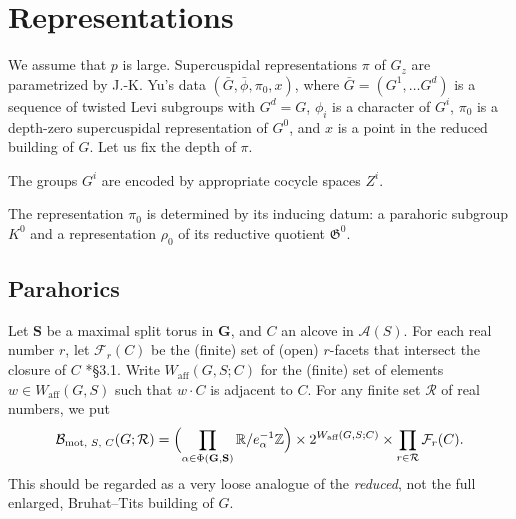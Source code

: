 \documentclass[12pt]{amsart}
\newcommand{\R}{{\mathbb R}}
\newcommand{\Z}{{\mathbb Z}}
\newcommand{\bG}{\mathbf{G}}
\def\R{\mathbb R}
\def\Z{\mathbb Z}
\newcommand{\fG}{\mathfrak G}
\theoremstyle{plain}
\theoremstyle{definition}
\begin{document}
\section{Representations}
We assume that $p$ is large. 
Supercuspidal representations $\pi$ of $G_z$ are parametrized by J.-K. Yu's data 
$(\bar G, \bar\phi, \pi_0, x)$, where $\bar G=(G^1, \dots G^d)$ is a sequence of twisted Levi subgroups with $G^d=G$, $\phi_i$ is a character of $G^i$, $\pi_0$ is a depth-zero supercuspidal representation of $G^0$, and $x$ is a point in the reduced building of $G$.
Let us fix the depth of $\pi$. 

The groups $G^i$ are encoded by appropriate  cocycle spaces $Z^i$.

The representation $\pi_0$ is determined by its inducing datum: a parahoric subgroup $K^0$ and a representation $\rho_0$ of its reductive quotient $\fG^0$. 

\subsection{Parahorics}

\renewcommand\AA{\mathcal A}
\newcommand\affW{W_{\text{aff}}}
\newcommand\BB{\mathcal B}
	\newcommand\motB{\BB_{\text{mot}}}
	\newcommand\motBpin{\BB_{\text{mot, \(S\), \(C\)}}}
\newcommand\bS{\mathbf S}
\newcommand\Cent{C}
\newcommand\dota{\cdot}
\newcommand\field{F}
	\newcommand\unfield{F^{\text{un}}}
\newcommand\Lxxx[1]{\ensuremath\spadesuit\footnote{\ensuremath\spadesuit\ #1}}
	\newcommand\citeme{\Lxxx{Cite me!}}
	\newcommand\refme{\Lxxx{Reference me!}}
\newcommand\muhat{\widehat\mu}
\newcommand\Nchar{\Phi}
\newcommand\NFTorbit{\widehat O}
\newcommand\Simple{\Delta}
\newcommand\st{\mathbin:}
\newcommand\stab{\operatorname{stab}}

\makeatletter
\newcommand\topcite[1]{\gdef\t@pic{#1}\cite{#1}}
\newcommand\loccit{\expandafter\cite\expandafter{\t@pic}}
\makeatother

Let \(\bS\) be a maximal split torus in  \(\bG\),
and \(C\) an alcove in \(\AA(S)\).
For each real number \(r\), let \(\mathcal F_r(C)\) be the
(finite) set of (open) \(r\)-facets that intersect the
closure of \(C\)
	\cite{debacker:nilp}*{\S3.1}.
Write \(\affW(G, S; C)\) for the (finite) set of elements
\(w \in \affW(G, S)\) such that \(w\dota C\) is adjacent to
\(C\).
For any finite set \(\mathcal R\) of real numbers, we put
\[
\motBpin(G; \mathcal R)
= \Bigl(
	\prod_{\alpha \in \Phi(\bG, \bS)} \R/e_\alpha^{-1}\Z
\Bigr) \times 
	2^{\affW(G, S; C)} \times
	\prod_{r \in \mathcal R} \mathcal F_r(C).
\]
This should be regarded as a very loose analogue of the
\emph{reduced}, not the full enlarged, Bruhat--Tits building
of \(G\).
\end{document}
